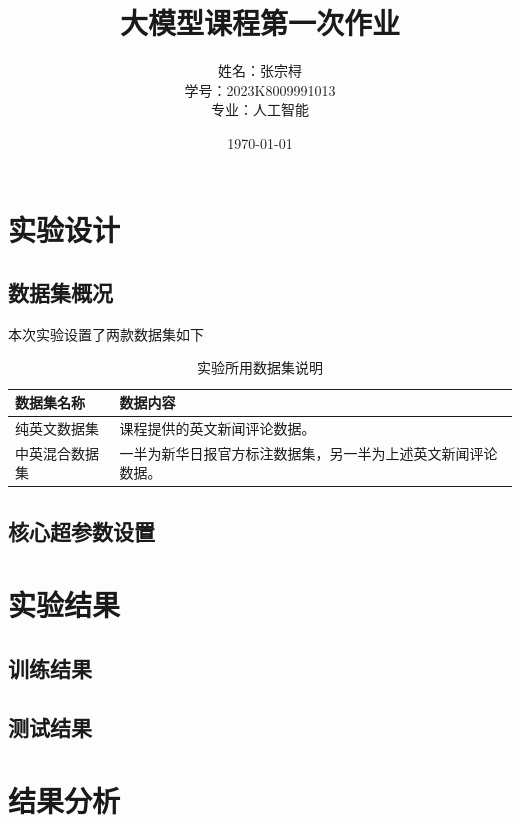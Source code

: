 \documentclass[a4paper,12pt]{ctexart} %
\title{\textbf{大模型课程第一次作业}}
\author{姓名：张宗桪 \\ 学号：2023K8009991013 \\ 专业：人工智能}
\date{\today}
\begin{document}
\pagestyle{plain} %

\maketitle
\thispagestyle{empty} %
\newpage

\tableofcontents
\newpage
\section{实验设计}


\subsection{数据集概况}
本次实验设置了两款数据集如下

\begin{table}[H]
    \centering
    \caption{实验所用数据集说明}
    \begin{tabular}{p{} p{}}
        \toprule
        数据集名称 & 数据内容 \\
        \midrule
        纯英文数据集 & 课程提供的英文新闻评论数据。 \\
        中英混合数据集 & 一半为新华日报官方标注数据集，另一半为上述英文新闻评论数据。 \\
        \bottomrule
    \end{tabular}
\end{table}

\subsection{核心超参数设置}


\section{实验结果}


\subsection{训练结果}


\subsection{测试结果}


\section{结果分析}
\end{document}
